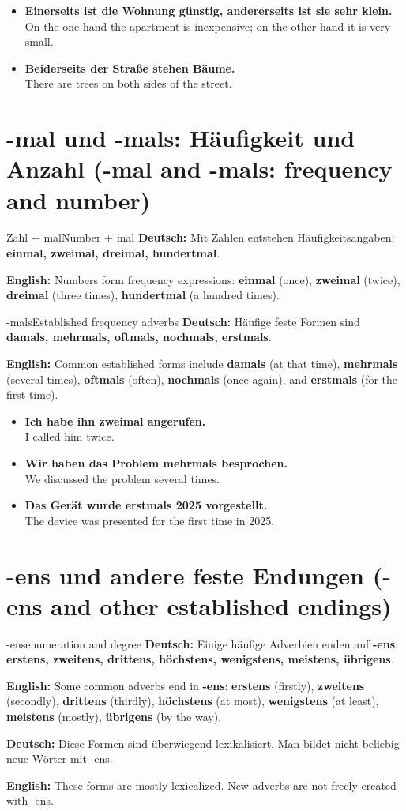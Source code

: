 \documentclass[a4paper,11pt]{article}
\newcommand{\GermanText}[1]{\textbf{Deutsch: }#1\par}
\newcommand{\EnglishText}[1]{{\small\color{SoftGray}\textbf{English: }#1\par}}
\newcommand{\ExampleItem}[2]{\item \textbf{#1}\\{\small\color{SoftGray}#2}}
\newcommand{\BSection}[2]{\section{#1 \textnormal{\small (#2)}}}
\begin{document}
\begin{exbox}
\begin{itemize}
\ExampleItem{Einerseits ist die Wohnung günstig, andererseits ist sie sehr klein.}{On the one hand the apartment is inexpensive; on the other hand it is very small.}
\ExampleItem{Beiderseits der Straße stehen Bäume.}{There are trees on both sides of the street.}
\end{itemize}
\end{exbox}

\BSection{-mal und -mals: Häufigkeit und Anzahl}{-mal and -mals: frequency and number}

\begin{grammarentry}{Zahl + mal}{Number + mal}
\GermanText{Mit Zahlen entstehen Häufigkeitsangaben: \textbf{einmal, zweimal, dreimal, hundertmal}.}
\EnglishText{Numbers form frequency expressions: \textbf{einmal} (once), \textbf{zweimal} (twice), \textbf{dreimal} (three times), \textbf{hundertmal} (a hundred times).}
\end{grammarentry}

\begin{grammarentry}{-mals}{Established frequency adverbs}
\GermanText{Häufige feste Formen sind \textbf{damals, mehrmals, oftmals, nochmals, erstmals}.}
\EnglishText{Common established forms include \textbf{damals} (at that time), \textbf{mehrmals} (several times), \textbf{oftmals} (often), \textbf{nochmals} (once again), and \textbf{erstmals} (for the first time).}
\end{grammarentry}

\begin{exbox}
\begin{itemize}
\ExampleItem{Ich habe ihn zweimal angerufen.}{I called him twice.}
\ExampleItem{Wir haben das Problem mehrmals besprochen.}{We discussed the problem several times.}
\ExampleItem{Das Gerät wurde erstmals 2025 vorgestellt.}{The device was presented for the first time in 2025.}
\end{itemize}
\end{exbox}

\BSection{-ens und andere feste Endungen}{-ens and other established endings}

\begin{grammarentry}{-ens}{enumeration and degree}
\GermanText{Einige häufige Adverbien enden auf \textbf{-ens}: \textbf{erstens, zweitens, drittens, höchstens, wenigstens, meistens, übrigens}.}
\EnglishText{Some common adverbs end in \textbf{-ens}: \textbf{erstens} (firstly), \textbf{zweitens} (secondly), \textbf{drittens} (thirdly), \textbf{höchstens} (at most), \textbf{wenigstens} (at least), \textbf{meistens} (mostly), \textbf{übrigens} (by the way).}
\GermanText{Diese Formen sind überwiegend lexikalisiert. Man bildet nicht beliebig neue Wörter mit -ens.}
\EnglishText{These forms are mostly lexicalized. New adverbs are not freely created with -ens.}
\end{grammarentry}
\end{document}
